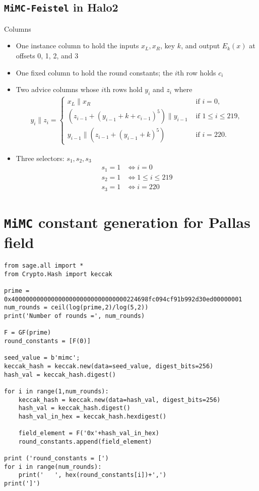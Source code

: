 \documentclass[10pt]{article}
\begin{document}
\subsection{\texttt{MiMC-Feistel} in Halo2}%
\label{subsec:mimc_feistel_in_halo2}
Columns
\begin{itemize}
  \item One instance column to hold the inputs $x_L, x_R$, key $k$, and output $E_k(x)$ at offsets 0, 1, 2, and 3
  \item One fixed column to hold the round constants; the $i$th row holds $c_i$
  \item Two advice columns whose $i$th rows hold $y_i$ and $z_i$ where
    \begin{align*}
      y_i \| z_i = 
      \begin{cases}
        x_L \| x_R & \text{ if } i = 0,\\
        \left( z_{i-1} + \left( y_{i-1}+k+c_{i-1}\right)^5  \right) \bigg\| y_{i-1} & \text{ if } 1 \le i \le  219,\\
        y_{i-1} \bigg\| \left( z_{i-1} + \left( y_{i-1}+k\right)^5  \right) & \text{ if } i=220.
      \end{cases}
    \end{align*}
  \item Three selectors: $s_1,s_2,s_3$
    \begin{align*}
      s_1 = 1 & \iff i=0\\
      s_2 = 1 & \iff 1 \le i\le 219\\
      s_3 = 1 & \iff i=220
    \end{align*}
\end{itemize}






\newpage
\appendix
\section{\texttt{MiMC} constant generation for Pallas field}%
\label{sec:mimc_constant_generation_for_pallas}
\begin{verbatim}
from sage.all import *
from Crypto.Hash import keccak

prime = 0x40000000000000000000000000000000224698fc094cf91b992d30ed00000001
num_rounds = ceil(log(prime,2)/log(5,2))
print('Number of rounds =', num_rounds)

F = GF(prime)
round_constants = [F(0)]

seed_value = b'mimc';
keccak_hash = keccak.new(data=seed_value, digest_bits=256)
hash_val = keccak_hash.digest()

for i in range(1,num_rounds):
    keccak_hash = keccak.new(data=hash_val, digest_bits=256)
    hash_val = keccak_hash.digest()
    hash_val_in_hex = keccak_hash.hexdigest()

    field_element = F('0x'+hash_val_in_hex)
    round_constants.append(field_element)

print ('round_constants = [')
for i in range(num_rounds):
    print('   ', hex(round_constants[i])+',')
print(']')
\end{verbatim}
\end{document}
